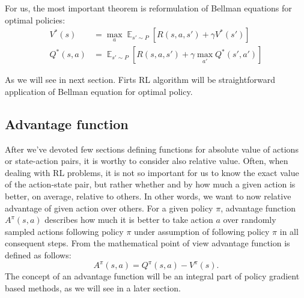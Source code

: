 For us, the most important theorem is reformulation of Bellman equations for optimal policies:
\begin{align*}
    V^*(s) &= \max_a \mathop{\mathbb{E}}_{s' \sim P} [R(s,a,s') + \gamma V^*(s')] \\
    Q^*(s,a) &= \mathop{\mathbb{E}}_{s' \sim P} [R(s,a,s') + \gamma \max_{a'} Q^*(s',a')]
\end{align*}

As we will see in next section. 
Firts RL algorithm will be straightforward application of Bellman equation for optimal policy. 

\subsection*{Advantage function}
After we've devoted few sections defining functions for absolute value of actions or state-action pairs, it is worthy to consider also relative value.
Often, when dealing with RL problems, it is not so important for us to know the exact value of the action-state pair, but rather whether and by how much a given action is better, on average, relative to others.
In other words, we want to now relative advantage of given action over others.
For a given policy $\pi$, advantage function $A^\pi(s,a)$ describes how much it is better to take action $a$ over randomly sampled actions following policy $\pi$ under assumption of following policy $\pi$ in all consequent steps.
From the mathematical point of view advantage function is defined as follows:
$$A^\pi(s,a) = Q^\pi(s,a) - V^\pi(s).$$
The concept of an advantage function will be an integral part of policy gradient based methods, as we will see in a later section.




